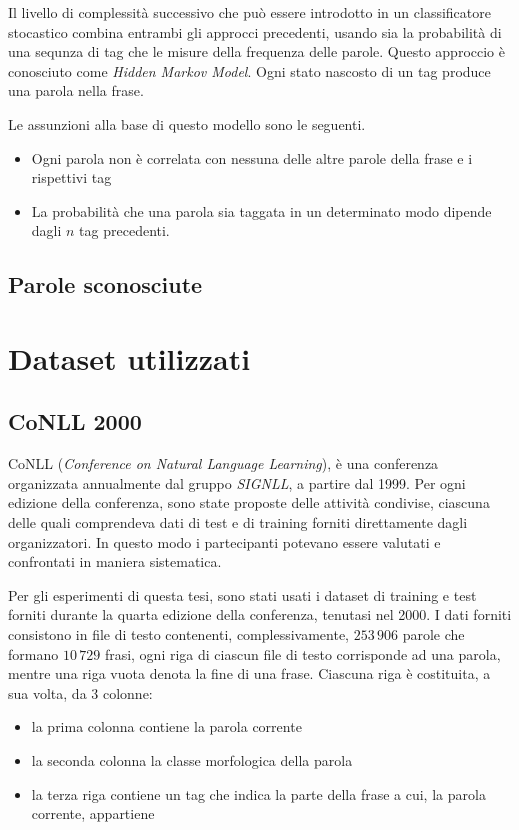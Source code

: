Il livello di complessit\`a successivo che pu\`o essere introdotto in un classificatore stocastico combina entrambi gli approcci precedenti, usando sia la probabilit\`a di una sequnza di tag che le misure della frequenza delle parole.
Questo approccio \`e conosciuto come \emph{Hidden Markov Model}.
Ogni stato nascosto di un tag produce una parola nella frase.

Le assunzioni alla base di questo modello sono le seguenti.

\begin{itemize}
  \item Ogni parola non \`e correlata con nessuna delle altre parole della frase e i rispettivi tag
  \item La probabilit\`a che una parola sia taggata in un determinato modo dipende dagli $n$ tag precedenti.
\end{itemize}

\subsection{Parole sconosciute}

\section{Dataset utilizzati}
\nocite{Zanchetta:2005}
\nocite{Attardi:2008}

\subsection{CoNLL 2000}
CoNLL (\emph{Conference on Natural Language Learning}), \`e una conferenza organizzata annualmente dal gruppo \emph{SIGNLL}, a partire dal 1999.
Per ogni edizione della conferenza, sono state proposte delle attivit\`a condivise, ciascuna delle quali comprendeva dati di test e di training forniti direttamente dagli organizzatori.
In questo modo i partecipanti potevano essere valutati e confrontati in maniera sistematica.

Per gli esperimenti di questa tesi, sono stati usati i dataset di training e test forniti durante la quarta edizione della conferenza, tenutasi nel 2000.
I dati forniti consistono in file di testo contenenti, complessivamente, $253\,906$ parole che formano $10\,729$ frasi, ogni riga di ciascun file di testo corrisponde ad una parola, mentre una riga vuota denota la fine di una frase.
Ciascuna riga \`e costituita, a sua volta, da 3 colonne:
\begin{itemize}
  \item la prima colonna contiene la parola corrente
  \item la seconda colonna la classe morfologica della parola
  \item la terza riga contiene un tag che indica la parte della frase a cui, la parola corrente, appartiene
\end{itemize}

